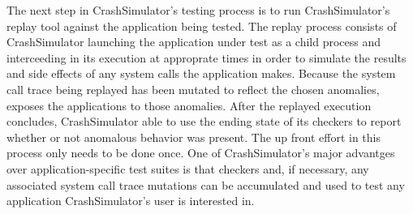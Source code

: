 
    The next step in CrashSimulator's testing process is to run CrashSimulator's
    replay tool against the application being tested.  The replay process
    consists of CrashSimulator launching the application under test as a child
    process and interceeding in its execution at approprate times in order to
    simulate the results and side effects of any system calls the application
    makes.  Because the system call trace being replayed has been mutated to
    reflect the chosen anomalies, exposes the applications to those
    anomalies. After the replayed execution concludes, CrashSimulator able to
    use the ending state of its checkers to report whether or not anomalous
    behavior was present.  The up front effort in this process only needs to be
    done once. One of CrashSimulator's major advantges over application-specific
    test suites is that checkers and, if necessary, any associated system call
    trace mutations can be accumulated and used to test any application
    CrashSimulator's user is interested in.



